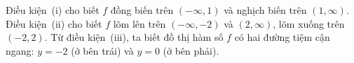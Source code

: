 \medskip
\noindent\solutiontag Điều kiện~(i) cho biết $f$ đồng biến trên $(-\infty, 1)$ và nghịch biến trên $(1, \infty)$. Điều kiện~(ii) cho biết $f$ lõm lên trên $(-\infty, -2)$ và $(2, \infty)$, lõm xuống trên $(-2, 2)$. Từ điều kiện~(iii), ta biết đồ thị hàm số $f$ có hai đường tiệm cận ngang: $y = -2$ (ở bên trái) và $y = 0$ (ở bên phải).
